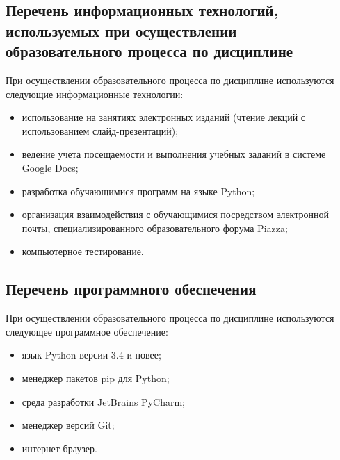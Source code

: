 \documentclass[a4paper,12pt]{article}
\begin{document}
\subsection{Перечень информационных технологий, используемых при осуществлении образовательного процесса по дисциплине}

При осуществлении образовательного процесса по дисциплине используются следующие информационные технологии:
\begin{itemize}[nolistsep]
  
\item использование на занятиях электронных изданий (чтение лекций с использованием слайд-презентаций);
  
\item ведение учета посещаемости и выполнения учебных заданий в системе Google Docs;
  
\item разработка обучающимися программ на языке Python;
  
\item организация взаимодействия с обучающимися посредством электронной почты, специализированного образовательного форума Piazza;
  
\item компьютерное тестирование.
  
\end{itemize}

\subsection{Перечень программного обеспечения}
При осуществлении образовательного процесса по дисциплине используются следующее программное обеспечение:
\begin{itemize}[nolistsep]
  
\item язык Python версии 3.4 и новее;
  
\item менеджер пакетов pip для Python;
  
\item среда разработки JetBrains PyCharm;
  
\item менеджер версий Git;
  
\item интернет-браузер.
  
\end{itemize}
\end{document}
